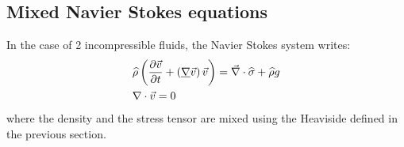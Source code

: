\documentclass[11pt,a4paper]{article}
\begin{document}
\subsection{Mixed Navier Stokes equations}
In the case of 2 incompressible fluids, the Navier Stokes system writes: 
\begin{align}
\label{eq:NS_multiphase}
& \widehat{\rho} \left( \frac{\partial \vec{v}}{\partial t} + \left( \underline{\nabla} \vec{v} \right) \vec{v}  \right) = \vec{\nabla} \cdot \widehat{\sigma} + \widehat{\rho} g \\ 
& \nabla \cdot \vec{v} = 0
\end{align}
where the density and the stress tensor are mixed using the Heaviside defined in the previous section.
\end{document}
